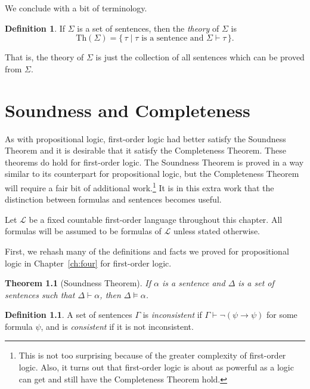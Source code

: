\documentclass[12pt]{amsbook}
\newcommand{\proves}{\vdash}
\theoremstyle{plain}
\newtheorem{thm}{Theorem}[chapter]
\theoremstyle{definition}
\newtheorem{defn}{Definition}[chapter]
\theoremstyle{remark}
\begin{document}
We conclude with a bit of terminology.

\begin{defn}  
If $\Sigma$ is a set of sentences,  then the {\em theory\/} of $\Sigma$ is  
\[
\mathrm{Th}(\Sigma) = \{\, \tau \mid \tau \text{\ is a sentence and\ } \Sigma \proves \tau \,\}.
\]  
\end{defn}

That is,  the theory of $\Sigma$ is just the collection of all sentences which can be proved from $\Sigma$.


%
%

\chapter{Soundness and Completeness} \label{ch:eight}

As with propositional logic,  first-order logic had better satisfy the Soundness Theorem and it is desirable that it satisfy the Completeness Theorem.  These theorems do hold for first-order logic.  The Soundness Theorem is proved in a way similar to its counterpart for propositional logic,  but the Completeness Theorem will require a fair bit of additional work.\footnote{This is not too surprising because of the greater complexity of first-order logic.  Also,  it turns out that first-order logic is about as powerful as a logic can get and still have the Completeness Theorem hold.}  It is in this extra work that the distinction between formulas and sentences becomes useful.

Let $\mathcal{L}$ be a fixed countable first-order language throughout this chapter.  All formulas will be assumed to be formulas of $\mathcal{L}$ unless stated otherwise.

First,  we rehash many of the definitions and facts we proved for propositional logic in Chapter~\ref{ch:four} for first-order logic.

\begin{thm}[Soundness Theorem] \label{t:fsnd} 
If $\alpha$ is a sentence and $\Delta$ is a set of sentences such that $\Delta \proves \alpha$,  then $\Delta \models \alpha$.
\end{thm}

\begin{defn}  
A set of sentences $\Gamma$ is {\em inconsistent\/} if $\Gamma \proves \lnot (\psi \to \psi)$ for some formula $\psi$,  and is {\em consistent\/} if it is not inconsistent. 
\end{defn}
\end{document}

